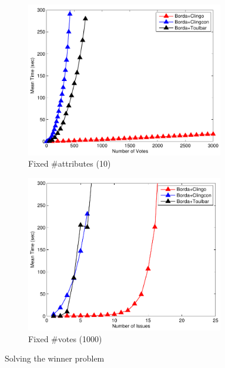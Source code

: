 {
	\begin{figure}
		\centering
    \begin{subfigure}[b]{0.45\textwidth}
			\centering
			\includegraphics[width=0.95\textwidth]{figs/LPTrees/win/bordaFISCICP.pdf}
			\caption{Fixed \#attributes (10)}
		\end{subfigure}
    \begin{subfigure}[b]{0.45\textwidth}
			\centering
			\includegraphics[width=0.95\textwidth]{figs/LPTrees/win/bordaFVSCICP.pdf}
			\caption{Fixed \#votes (1000)}
		\end{subfigure}

		\caption{Solving the winner problem}
	\end{figure}
}

